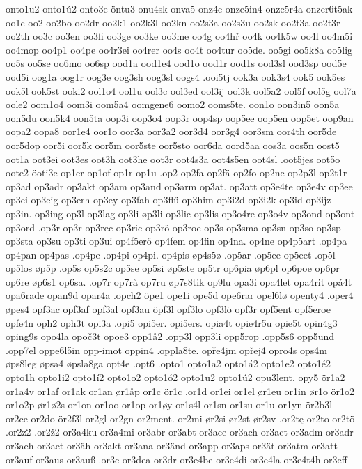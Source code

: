 {{onto1u2
onto1ú2
onto3e
öntu3
onu4sk
onva5
onz4e
onze5in4
onze5r4a
onzer6t5ak
oo1c
oo2
oo2bo
oo2dr
oo2k1
oo2k3l
oo2kn
oo2s3a
oo2s3u
oo2sk
oo2t3a
oo2t3r
oo2th
oo3c
oo3en
oo3fi
oo3ge
oo3ke
oo3me
oo4g
oo4hř
oo4k
oo4k5w
oo4l
oo4m5i
oo4mop
oo4p1
oo4pe
oo4r3ei
oo4rer
oo4s
oo4t
oo4tur
oo5de.
oo5gi
oo5k8a
oo5lig
oo5s
oo5se
oo6mo
oo6sp
ood1a
ood1e4
ood1o
ood1r
ood1s
ood3sl
ood3sp
ood5e
ood5i
oog1a
oog1r
oog3e
oog3sh
oog3sl
oogs4
.ooi5tj
ook3a
ook3s4
ook5
ook5es
ook5l
ook5st
ooki2
ool1o4
ool1u
ool3c
ool3ed
ool3ij
ool3k
ool5a2
ool5f
ool5g
ool7a
oole2
oom1o4
oom3i
oom5a4
oomgene6
oomo2
ooms5te.
oon1o
oon3in5
oon5a
oon5du
oon5k4
oon5ta
oop3i
oop3o4
oop3r
oop4sp
oop5ee
oop5en
oop5et
oop9an
oopa2
oopa8
oor1e4
oor1o
oor3a
oor3a2
oor3d4
oor3g4
oor3sm
oor4th
oor5de
oor5dop
oor5i
oor5k
oor5m
oor5ste
oor5sto
oor6da
oord5aa
oos3a
oos5n
oost5
oot1a
oot3ei
oot3es
oot3h
oot3he
oot3r
oot4s3a
oot4s5en
oot4sl
.oot5jes
oot5o
oote2
öoti3e
op1er
op1of
op1r
op1u
.op2
op2fa
op2fä
op2fo
op2ne
op2p3l
op2t1r
op3ad
op3adr
op3akt
op3am
op3and
op3arm
op3at.
op3att
op3e4te
op3e4v
op3ee
op3ei
op3eig
op3erh
op3ey
op3fah
op3flü
op3him
op3i2d
op3i2k
op3id
op3ijz
op3in.
op3ing
op3l
op3lag
op3li
øp3li
op3lic
op3lis
op3o4re
op3o4v
op3ond
op3ont
op3ord
.op3r
op3r
op3rec
op3ric
op3rö
op3roe
op3s
op3sma
op3sn
op3so
op3sp
op3sta
op3su
op3ti
op3ui
op4f5erö
op4fem
op4fin
op4na.
op4ne
op4p5art
.op4pa
op4pan
op4pas
.op4pe
.op4pi
op4pi.
op4pis
øp4s5ø
.op5ar
.op5ee
op5eet
.op5l
op5los
øp5p
.op5s
op5s2c
op5se
op5si
øp5ste
op5tr
op6pia
øp6pl
op6poe
op6pr
op6re
øp6s1
op6sa.
.op7r
op7rå
op7ru
øp7s8tik
op9lu
opa3i
opa4let
opa4rit
opá4t
opa6rade
opan9d
opar4a
.opch2
öpe1
ope1i
ope5d
ope6rar
opel6lø
openty4
.oper4
øpes4
opf3ac
opf3af
opf3al
opf3au
öpf3l
opf3lo
opf3lö
opf3r
opf5ent
opf5eroe
opfe4n
oph2
oph3t
opi3a
.opi5
opi5er.
opi5ers.
opia4t
opie4r5u
opie5t
opin4g3
oping9s
opo4la
opoč3t
opoe3
opp1å2
.opp3l
opp3li
opp5rop
.opp5s6
opp5und
.opp7el
oppe6l5in
opp-imot
oppin4
.oppla8te.
opře4jm
opřej4
opro4s
ops4m
øps8leg
øpsa4
øpsla8ga
opt4e
.opt6
.opto1
opto1a2
opto1á2
opto1e2
opto1é2
opto1h
opto1i2
opto1í2
opto1o2
opto1ó2
opto1u2
opto1ú2
opu3lent.
opy5
ör1a2
or1a4v
or1af
or1ak
or1an
ør1åp
or1c
ör1c
.or1d
or1ei
or1el
ør1eu
or1in
ør1o
ör1o2
or1o2p
ør1ø2s
or1on
or1oo
or1op
or1øy
or1s4l
or1sn
or1su
or1u
or1yn
ör2b3l
or2ce
or2do
ör2f3l
or2gl
or2gn
or2ment.
or2mi
ør2si
ør2st
ør2sv
.or2tę
or2to
or2tö
.or2z2
.or2ż2
or3a4ku
or3a4mi
or3abr
or3abt
or3ace
or3ach
or3act
or3adm
or3adr
or3aeh
or3aet
or3äh
or3akt
or3ana
or3änd
or3app
or3aps
or3ät
or3atm
or3att
or3auf
or3aus
or3auß
.or3c
or3dea
or3dr
or3e4be
or3e4di
or3e4la
or3e4t4h
or3eff
}}
